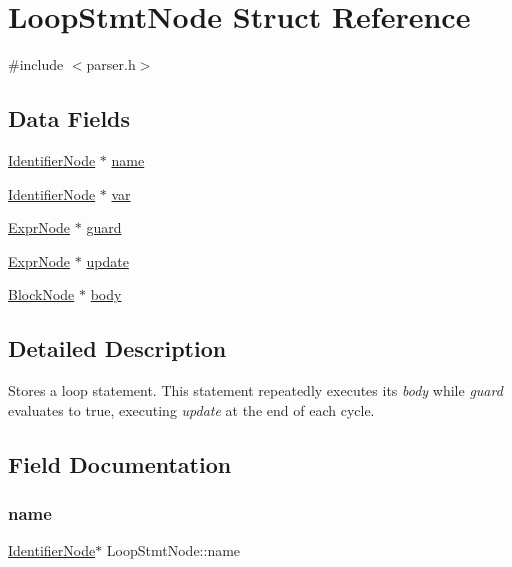 \hypertarget{struct_loop_stmt_node}{}\section{Loop\+Stmt\+Node Struct Reference}
\label{struct_loop_stmt_node}


{\ttfamily \#include $<$parser.\+h$>$}

\subsection*{Data Fields}
\begin{DoxyCompactItemize}
\item 
\hyperlink{parser_8h_a930727769b8a8eb0d24d474f3aa12a43}{Identifier\+Node} $\ast$ \hyperlink{struct_loop_stmt_node_a36b401d6c4fd2c16a68de026b99187f3}{name}
\item 
\hyperlink{parser_8h_a930727769b8a8eb0d24d474f3aa12a43}{Identifier\+Node} $\ast$ \hyperlink{struct_loop_stmt_node_afb3820072966231fd1d43eea8ebd9234}{var}
\item 
\hyperlink{struct_expr_node}{Expr\+Node} $\ast$ \hyperlink{struct_loop_stmt_node_a53a86fb7f989cf43f54192b8f3ad6c1a}{guard}
\item 
\hyperlink{struct_expr_node}{Expr\+Node} $\ast$ \hyperlink{struct_loop_stmt_node_a0400ab555fff51b09f79c495af20f37f}{update}
\item 
\hyperlink{struct_block_node}{Block\+Node} $\ast$ \hyperlink{struct_loop_stmt_node_a6844fd9206ed5d6b4fd48fc1365969aa}{body}
\end{DoxyCompactItemize}


\subsection{Detailed Description}
Stores a loop statement. This statement repeatedly executes its {\itshape body} while {\itshape guard} evaluates to true, executing {\itshape update} at the end of each cycle. 

\subsection{Field Documentation}
\mbox{\label{struct_loop_stmt_node_a36b401d6c4fd2c16a68de026b99187f3}} 
\subsubsection{\texorpdfstring{name}{name}}
{\footnotesize\ttfamily \hyperlink{parser_8h_a930727769b8a8eb0d24d474f3aa12a43}{Identifier\+Node}$\ast$ Loop\+Stmt\+Node\+::name}


